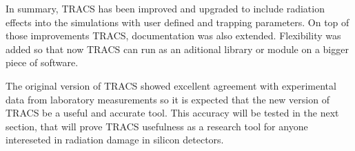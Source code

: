 In summary, TRACS has been improved and upgraded to include radiation effects into the simulations with user defined \neff and trapping parameters. On top of those improvements TRACS, documentation was also extended. Flexibility was added so that now TRACS can run as an aditional library or module on a bigger piece of software.

The original version of TRACS showed excellent agreement with experimental data from laboratory measurements so it is expected that the new version of TRACS be a useful and accurate tool. This accuracy will be tested in the next section, that will prove TRACS usefulness as a research tool for anyone intereseted in radiation damage in silicon detectors.

